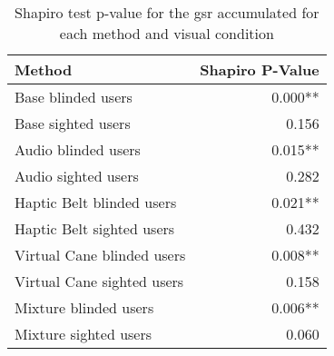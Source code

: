 
\begin{table}[!htb]
\centering
\caption{Shapiro test p-value for the gsr accumulated for each method and visual condition}
\label{tab:shapiro_gsr_sum}
\begin{tabular}{lr}
\toprule
                    Method & Shapiro P-Value \\
\midrule
        Base blinded users &         0.000** \\
        Base sighted users &           0.156 \\
       Audio blinded users &         0.015** \\
       Audio sighted users &           0.282 \\
 Haptic Belt blinded users &         0.021** \\
 Haptic Belt sighted users &           0.432 \\
Virtual Cane blinded users &         0.008** \\
Virtual Cane sighted users &           0.158 \\
     Mixture blinded users &         0.006** \\
     Mixture sighted users &           0.060 \\
\bottomrule
\end{tabular}
\end{table}

